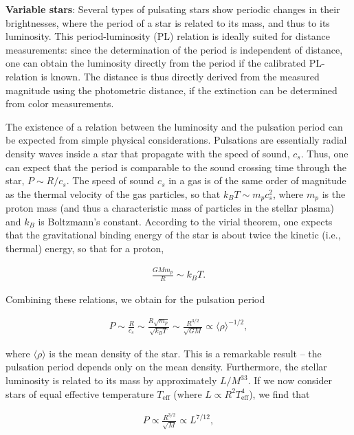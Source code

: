 \documentclass[a4paper,11pt]{article}
\begin{document}
{\noindent}\textbf{Variable stars}: Several types of pulsating stars show periodic changes in their brightnesses, where the period of a star is related to its mass, and thus to its luminosity. This period-luminosity (PL) relation is ideally suited for distance measurements: since the determination of the period is independent of distance, one can obtain the luminosity directly from the period if the calibrated PL-relation is known. The distance is thus directly derived from the measured magnitude using the photometric distance, if the extinction can be determined from color measurements.

{\noindent}The existence of a relation between the luminosity and the pulsation period can be expected from simple physical considerations. Pulsations are essentially radial density waves inside a star that propagate with the speed of sound, $c_s$. Thus, one can expect that the period is comparable to the sound crossing time through the star, $P\sim R/c_s$. The speed of sound $c_s$ in a gas is of the same order of magnitude as the thermal velocity of the gas particles, so that $k_BT\sim m_pc_s^2$, where $m_p$ is the proton mass (and thus a characteristic mass of particles in the stellar plasma) and $k_B$ is Boltzmann's constant. According to the virial theorem, one expects that the gravitational binding energy of the star is about twice the kinetic (i.e., thermal) energy, so that for a proton,

\begin{align*}
    \frac{GMm_p}{R} \sim k_BT.
\end{align*}

{\noindent}Combining these relations, we obtain for the pulsation period

\begin{align*}
    P\sim\frac{R}{c_s}\sim\frac{R\sqrt{m_p}}{\sqrt{k_BT}} \sim\frac{R^{3/2}}{\sqrt{GM}} \propto \langle\rho\rangle^{-1/2},
\end{align*}

{\noindent}where $\langle\rho\rangle$ is the mean density of the star. This is a remarkable result -- the pulsation period depends only on the mean density. Furthermore, the stellar luminosity is related to its mass by approximately $L/M^33$. If we now consider stars of equal effective temperature $T_\mathrm{eff}$ (where $L\propto R^2T_\mathrm{eff}^4$), we find that

\begin{align*}
    P \propto \frac{R^{3/2}}{\sqrt{M}} \propto L^{7/12},
\end{align*}
\end{document}
